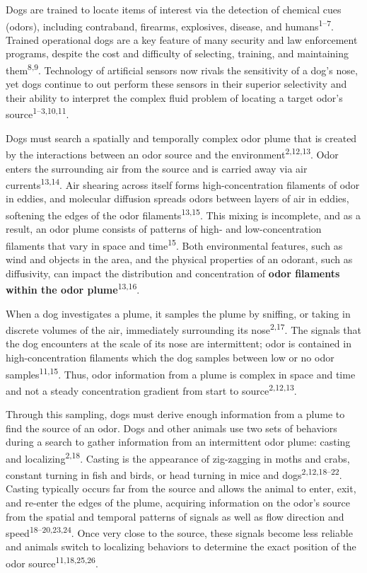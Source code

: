 \documentclass[
]{article}
\begin{document}
Dogs are trained to locate items of interest via the detection of chemical cues (odors), including contraband, firearms, explosives, disease, and humans\textsuperscript{1--7}. Trained operational dogs are a key feature of many security and law enforcement programs, despite the cost and difficulty of selecting, training, and maintaining them\textsuperscript{8,9}. Technology of artificial sensors now rivals the sensitivity of a dog's nose, yet dogs continue to out perform these sensors in their superior selectivity and their ability to interpret the complex fluid problem of locating a target odor's source\textsuperscript{1--3,10,11}.

Dogs must search a spatially and temporally complex odor plume that is created by the interactions between an odor source and the environment\textsuperscript{2,12,13}. Odor enters the surrounding air from the source and is carried away via air currents\textsuperscript{13,14}. Air shearing across itself forms high-concentration filaments of odor in eddies, and molecular diffusion spreads odors between layers of air in eddies, softening the edges of the odor filaments\textsuperscript{13,15}. This mixing is incomplete, and as a result, an odor plume consists of patterns of high- and low-concentration filaments that vary in space and time\textsuperscript{15}. Both environmental features, such as wind and objects in the area, and the physical properties of an odorant, such as diffusivity, can impact the distribution and concentration of \textbf{odor filaments within the odor plume}\textsuperscript{13,16}.

When a dog investigates a plume, it samples the plume by sniffing, or taking in discrete volumes of the air, immediately surrounding its nose\textsuperscript{2,17}. The signals that the dog encounters at the scale of its nose are intermittent; odor is contained in high-concentration filaments which the dog samples between low or no odor samples\textsuperscript{11,15}. Thus, odor information from a plume is complex in space and time and not a steady concentration gradient from start to source\textsuperscript{2,12,13}.

Through this sampling, dogs must derive enough information from a plume to find the source of an odor. Dogs and other animals use two sets of behaviors during a search to gather information from an intermittent odor plume: casting and localizing\textsuperscript{2,18}. Casting is the appearance of zig-zagging in moths and crabs, constant turning in fish and birds, or head turning in mice and dogs\textsuperscript{2,12,18--22}. Casting typically occurs far from the source and allows the animal to enter, exit, and re-enter the edges of the plume, acquiring information on the odor's source from the spatial and temporal patterns of signals as well as flow direction and speed\textsuperscript{18--20,23,24}. Once very close to the source, these signals become less reliable and animals switch to localizing behaviors to determine the exact position of the odor source\textsuperscript{11,18,25,26}.
\end{document}

